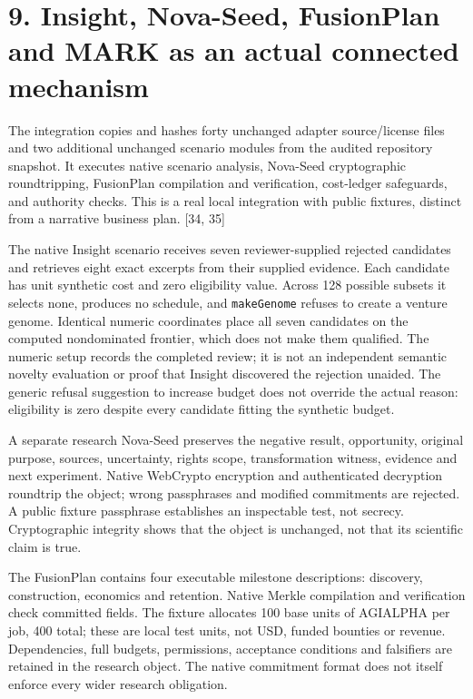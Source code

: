 \documentclass[
  11pt,
]{article}
\begin{document}
\hypertarget{insight-nova-seed-fusionplan-and-mark-as-an-actual-connected-mechanism}{%
\section{9. Insight, Nova-Seed, FusionPlan and MARK as an actual
connected
mechanism}\label{insight-nova-seed-fusionplan-and-mark-as-an-actual-connected-mechanism}}

The integration copies and hashes forty unchanged adapter source/license
files and two additional unchanged scenario modules from the audited
repository snapshot. It executes native scenario analysis, Nova-Seed
cryptographic roundtripping, FusionPlan compilation and verification,
cost-ledger safeguards, and authority checks. This is a real local
integration with public fixtures, distinct from a narrative business
plan. {[}34, 35{]}

The native Insight scenario receives seven reviewer-supplied rejected
candidates and retrieves eight exact excerpts from their supplied
evidence. Each candidate has unit synthetic cost and zero eligibility
value. Across 128 possible subsets it selects none, produces no
schedule, and \texttt{makeGenome} refuses to create a venture genome.
Identical numeric coordinates place all seven candidates on the computed
nondominated frontier, which does not make them qualified. The numeric
setup records the completed review; it is not an independent semantic
novelty evaluation or proof that Insight discovered the rejection
unaided. The generic refusal suggestion to increase budget does not
override the actual reason: eligibility is zero despite every candidate
fitting the synthetic budget.

A separate research Nova-Seed preserves the negative result,
opportunity, original purpose, sources, uncertainty, rights scope,
transformation witness, evidence and next experiment. Native WebCrypto
encryption and authenticated decryption roundtrip the object; wrong
passphrases and modified commitments are rejected. A public fixture
passphrase establishes an inspectable test, not secrecy. Cryptographic
integrity shows that the object is unchanged, not that its scientific
claim is true.

The FusionPlan contains four executable milestone descriptions:
discovery, construction, economics and retention. Native Merkle
compilation and verification check committed fields. The fixture
allocates 100 base units of AGIALPHA per job, 400 total; these are local
test units, not USD, funded bounties or revenue. Dependencies, full
budgets, permissions, acceptance conditions and falsifiers are retained
in the research object. The native commitment format does not itself
enforce every wider research obligation.
\end{document}
